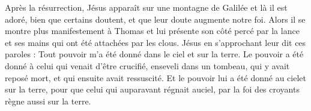  Après la résurrection, Jésus apparaît sur une montagne de Galilée et là il est adoré, bien que certains doutent, et que leur doute augmente notre foi. Alors il se montre plus manifestement à Thomas et lui présente son côté percé par la lance et ses mains qui ont été attachées par les clous. Jésus en s’approchant leur dit ces paroles : Tout pouvoir m'a été donné dans le ciel et sur la terre. Le pouvoir a été donné à celui qui venait d’être crucifié, enseveli dans un tombeau, qui y avait reposé mort, et qui ensuite avait ressuscité. Et le pouvoir lui a été donné au cielet sur la terre, pour que celui qui auparavant régnait auciel, par la foi des croyants règne aussi sur la terre.